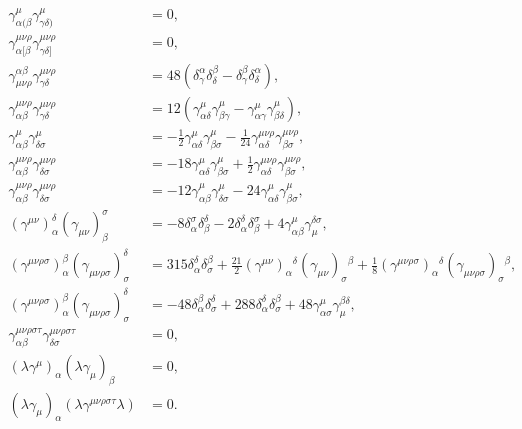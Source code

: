 \begin{align}
		\gamma_{\alpha(\beta}^\mu \gamma_{\gamma\delta)}^\mu &= 0, \\
		\gamma_{\alpha[\beta}^{\mu\nu\rho} \gamma_{\gamma\delta]}^{\mu\nu\rho} &= 0, \\
		\gamma_{\mu\nu\rho}^{\alpha\beta} \gamma_{\gamma\delta}^{\mu\nu\rho} &= 48 \left( \delta_\gamma^\alpha \delta_\delta^\beta - \delta_\gamma^\beta \delta_\delta^\alpha \right), \\
		\gamma_{\alpha\beta}^{\mu\nu\rho} \gamma_{\gamma\delta}^{\mu\nu\rho} &= 12 \left( \gamma_{\alpha\delta}^\mu \gamma_{\beta\gamma}^\mu - \gamma_{\alpha\gamma}^\mu \gamma_{\beta\delta}^\mu \right), \\
		\gamma_{\alpha\beta}^\mu \gamma_{\delta\sigma}^\mu &= -\frac{1}{2} \gamma_{\alpha\delta}^\mu \gamma_{\beta\sigma}^\mu - \frac{1}{24} \gamma_{\alpha\delta}^{\mu\nu\rho} \gamma_{\beta\sigma}^{\mu\nu\rho}, \\
		\gamma_{\alpha\beta}^{\mu\nu\rho} \gamma_{\delta\sigma}^{\mu\nu\rho} &= -18 \gamma_{\alpha\delta}^\mu \gamma_{\beta\sigma}^\mu + \frac{1}{2} \gamma_{\alpha\delta}^{\mu\nu\rho} \gamma_{\beta\sigma}^{\mu\nu\rho}, \\
		\gamma_{\alpha\beta}^{\mu\nu\rho} \gamma_{\delta\sigma}^{\mu\nu\rho} &= -12 \gamma_{\alpha\beta}^\mu \gamma_{\delta\sigma}^\mu - 24 \gamma_{\alpha\delta}^\mu \gamma_{\beta\sigma}^\mu, \\
		(\gamma^{\mu\nu})_\alpha^\delta (\gamma_{\mu\nu})_\beta^\sigma &= -8 \delta_\alpha^\sigma \delta_\beta^\delta - 2 \delta_\alpha^\delta \delta_\beta^\sigma + 4 \gamma_{\alpha\beta}^\mu \gamma_\mu^{\delta\sigma}, \\
		(\gamma^{\mu\nu\rho\sigma})_\alpha^\beta (\gamma_{\mu\nu\rho\sigma})_\sigma^\delta &= 315 \delta_{\alpha}^{\delta} \delta_{\sigma}^{\beta} + \frac{21}{2} (\gamma^{\mu\nu})_{\alpha}{}^{\delta} (\gamma_{\mu\nu})_{\sigma}{}^{\beta} + \frac{1}{8} (\gamma^{\mu\nu\rho\sigma})_{\alpha}{}^{\delta} (\gamma_{\mu\nu\rho\sigma})_{\sigma}{}^{\beta}, \\
		(\gamma^{\mu\nu\rho\sigma})_{\alpha}^{\beta} (\gamma_{\mu\nu\rho\sigma})_{\sigma}^{\delta} &= -48 \delta_\alpha^\beta \delta_\sigma^\delta + 288 \delta_\alpha^\delta \delta_\sigma^\beta + 48 \gamma_{\alpha\sigma}^\mu \gamma_\mu^{\beta\delta},\\
		\gamma_{\alpha\beta}^{\mu\nu\rho\sigma\tau} \gamma_{\delta\sigma}^{\mu\nu\rho\sigma\tau} &= 0, \\
		(\lambda \gamma^\mu)_\alpha (\lambda \gamma_\mu)_\beta &= 0, \\
		(\lambda \gamma_\mu)_\alpha (\lambda \gamma^{\mu\nu\rho\sigma\tau} \lambda) &= 0.
\end{align}